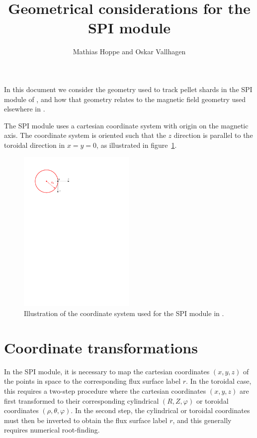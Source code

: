 \documentclass{notes}
\title{Geometrical considerations for the SPI module}
\author{Mathias Hoppe and Oskar Vallhagen}
\begin{document}
    \maketitle

    \noindent
    In this document we consider the geometry used to track pellet shards in the
    SPI module of \DREAM, and how that geometry relates to the magnetic field
    geometry used elsewhere in \DREAM.

    The SPI module uses a cartesian coordinate system with origin on the
    magnetic axis. The coordinate system is oriented such that the $z$ direction
    is parallel to the toroidal direction in $x=y=0$, as illustrated in
    figure~\ref{fig:geom}.

    \begin{figure}
        \centering
        \includegraphics[width=0.5\textwidth]{figs/SPIgeom.pdf}
        \caption{
            Illustration of the coordinate system used for the SPI module in
            \DREAM.
        }
        \label{fig:geom}
    \end{figure}

    \section{Coordinate transformations}
    In the SPI module, it is necessary to map the cartesian coordinates
    $(x,y,z)$ of the points in space to the corresponding flux surface label
    $r$. In the toroidal case, this requires a two-step procedure where the
    cartesian coordinates $(x,y,z)$ are first transformed to their corresponding
    cylindrical $(R,Z,\varphi)$ or toroidal coordinates $(\rho,\theta,\varphi)$.
    In the second step, the cylindrical or toroidal coordinates must then be
    inverted to obtain the flux surface label $r$, and this generally requires
    numerical root-finding.
\end{document}

